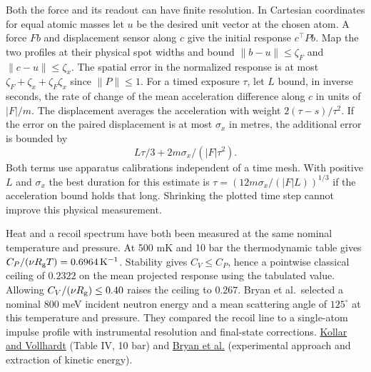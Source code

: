 \documentclass[11pt,a4paper]{article}
\begin{document}
Both the force and its readout can have finite resolution. In Cartesian
coordinates for equal atomic masses let \(u\) be the desired unit vector
at the chosen atom. A force \(F b\) and displacement sensor along \(c\)
give the initial response \(c^\top P b\). Map the two profiles at their
physical spot widths and bound \(\|b-u\|\le\zeta_F\) and
\(\|c-u\|\le\zeta_x\). The spatial error in the normalized response is
at most \(\zeta_F+\zeta_x+\zeta_F\zeta_x\) since \(\|P\|\le1\). For a
timed exposure \(\tau\), let \(L\) bound, in inverse seconds, the rate
of change of the mean acceleration difference along \(c\) in units of
\(|F|/m\). The displacement averages the acceleration with weight
\(2(\tau-s)/\tau^2\). If the error on the paired displacement is at most
\(\sigma_x\) in metres, the additional error is bounded by \[
       L\tau/3+2m\sigma_x/(|F|\tau^2).
\] Both terms use apparatus calibrations independent of a time mesh.
With positive \(L\) and \(\sigma_x\) the best duration for this estimate
is \(\tau=(12m\sigma_x/(|F|L))^{1/3}\) if the acceleration bound holds
that long. Shrinking the plotted time step cannot improve this physical
measurement.

Heat and a recoil spectrum have both been measured at the same nominal
temperature and pressure. At 500 mK and 10 bar the thermodynamic table
gives \(C_P/(\nu R_{\rm g}T)=0.6964\,{\rm K}^{-1}\). Stability gives
\(C_V\le C_P\), hence a pointwise classical ceiling of \(0.2322\) on the
mean projected response using the tabulated value. Allowing
\(C_V/(\nu R_{\rm g})\le0.40\) raises the ceiling to \(0.267\). Bryan et
al.~selected a nominal 800 meV incident neutron energy and a mean
scattering angle of \(125^\circ\) at this temperature and pressure. They
compared the recoil line to a single-atom impulse profile with
instrumental resolution and final-state corrections.
\href{https://arxiv.org/pdf/cond-mat/9906222}{Kollar and Vollhardt}
(Table IV, 10 bar) and
\href{https://doi.org/10.1209/0295-5075/115/66001}{Bryan et al.}
(experimental approach and extraction of kinetic energy).
\end{document}
